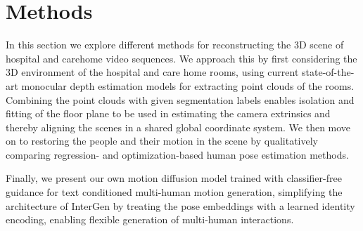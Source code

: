 \chapter{Methods}
In this section we explore different methods for reconstructing the 3D scene of hospital and carehome video sequences. We approach this by first considering the 3D environment of the hospital and care home rooms, using current state-of-the-art monocular depth estimation models for extracting point clouds of the rooms. Combining the point clouds with given segmentation labels enables isolation and fitting of the floor plane to be used in estimating the camera extrinsics and thereby aligning the scenes in a shared global coordinate system. We then move on to restoring the people and their motion in the scene by qualitatively comparing regression- and optimization-based human pose estimation methods. %

Finally, we present our own motion diffusion model trained with classifier-free guidance for text conditioned multi-human motion generation, simplifying the architecture of InterGen by treating the pose embeddings with a learned identity encoding, enabling flexible generation of multi-human interactions. %


